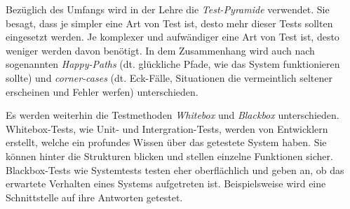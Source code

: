 Bezüglich des Umfangs wird in der Lehre die \textit{Test-Pyramide} verwendet. Sie besagt, dass je simpler eine Art von Test ist, desto mehr dieser Tests sollten eingesetzt werden. Je komplexer und aufwändiger eine Art von Test ist, desto weniger werden davon benötigt. In dem Zusammenhang wird auch nach sogenannten \textit{Happy-Paths} (dt. glückliche Pfade, wie das System funktionieren sollte) und \textit{corner-cases} (dt. Eck-Fälle, Situationen die vermeintlich seltener erscheinen und Fehler werfen) unterschieden. \cite[S. 65\psqq]{ElMorabea:2021}

Es werden weiterhin die Testmethoden \textit{Whitebox} und \textit{Blackbox} unterschieden. Whitebox-Tests, wie Unit- und Intergration-Tests, werden von Entwicklern erstellt, welche ein profundes Wissen über das getestete System haben. Sie können hinter die Strukturen blicken und stellen einzelne Funktionen sicher. Blackbox-Tests wie Systemtests testen eher oberflächlich und geben an, ob das erwartete Verhalten eines Systems aufgetreten ist. Beispielsweise wird eine Schnittstelle auf ihre Antworten getestet. \cite[S. 4\psq]{Pi:2020}
